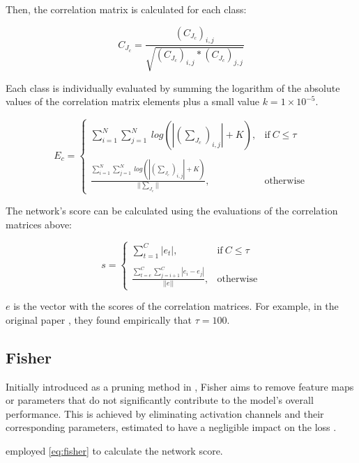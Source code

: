 Then, the correlation matrix is calculated for each class:

\begin{equation}
    C_{J_c} = \frac{(C_{J_c})_{i,j}}{\sqrt{(C_{J_c})_{i,j} * (C_{J_c})_{j,j}}}
\end{equation}


Each class is individually evaluated by summing the logarithm of the absolute values of the correlation matrix elements plus a small value $k = 1 \times 10^{-5}$.

\begin{equation}
    E_c = 
    \begin{cases}
        \sum^N_{i=1} \sum^N_{j=1}\ log(|(\sum_{J_c})_{i,j}| + K), & \text{if}\ C \leq \tau \\ \\ 
        \frac{\sum^N_{i=1} \sum^N_{j=1}\ log(|(\sum_{J_c})_{i,j}| + K)}{||\sum_{J_c}||}, & \text{otherwise}
    \end{cases}
\end{equation}

The network's score can be calculated using the evaluations of the correlation matrices above: 

\begin{equation}
    s = 
    \begin{cases}
        \sum_{t=1}^C |e_t|, & \text{if}\ C \leq \tau \\ \\ 
        \frac{\sum_{t=e}^C \sum_{j=i+1}^C |e_i - e_j|}{||e||}, & \text{otherwise}
    \end{cases}
\end{equation}

$e$ is the vector with the scores of the correlation matrices. For example, in the original paper \autocite{lopes2021epe}, they found empirically that $\tau = 100$. 


\subsection{Fisher}
Initially introduced as a pruning method in \autocite{DBLP:journals/corr/abs-1801-05787}, Fisher aims to remove feature maps or parameters that do not significantly contribute to the model's overall performance. This is achieved by eliminating activation channels and their corresponding parameters, estimated to have a negligible impact on the loss \autocite{abdelfattah2021zero}.

\cite{DBLP:journals/corr/abs-1801-05787} employed \cref{eq:fisher} to calculate the network score. 

